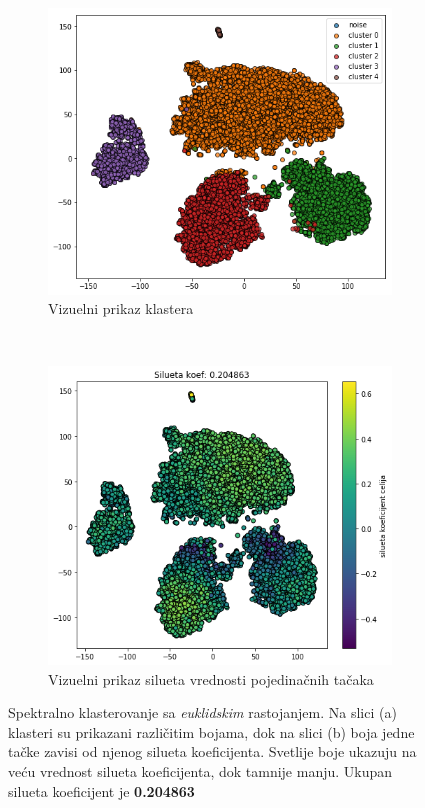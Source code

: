 \documentclass[a4paper]{article}
\begin{document}
\begin{figure}[H]
	\centering
	
	\begin{subfigure}[normla]{0.5\textwidth}
		\includegraphics[scale=0.3]{spektral_nmf_grp1_euklidsko}
		\caption{Vizuelni prikaz klastera}
		\label{spektral_nmf_grp1_euklidsko_A}
	\end{subfigure}
	~
	\begin{subfigure}[normla]{0.4\textwidth}
		\includegraphics[scale=0.3]{spektral_nmf_grp1_euklidsko_silueta}
		\caption{Vizuelni prikaz silueta vrednosti pojedinačnih tačaka}
		\label{spektral_nmf_grp1_euklidsko_B}
	\end{subfigure}
	\caption{Spektralno klasterovanje sa \textit{euklidskim} rastojanjem. Na slici (a) klasteri su prikazani različitim bojama, dok na slici (b) boja jedne tačke zavisi od njenog silueta koeficijenta. Svetlije boje ukazuju na veću vrednost silueta koeficijenta, dok tamnije manju. Ukupan silueta koeficijent je \textbf{0.204863}}
\label{spektral_nmf_grp1_euklidsko}
\end{figure}
\end{document}
